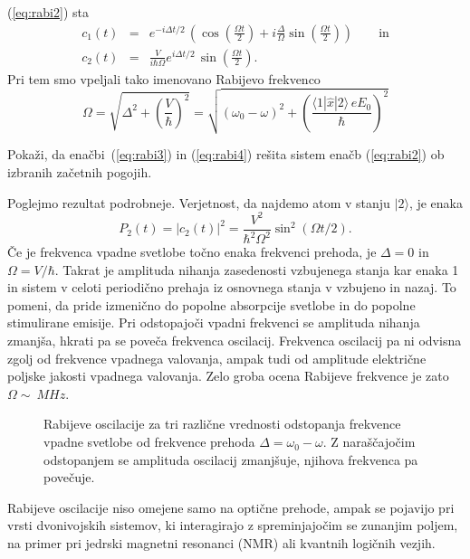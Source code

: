 (\ref{eq:rabi2}) sta 
\begin{eqnarray}
c_1(t)&=&e^{-i\Delta t/2}\, \left(\cos\left(\frac{\Omega t}{2}\right) + 
i \frac{\Delta}{\Omega} \sin\left(\frac{\Omega t}{2}\right) \right)\qquad \mathrm{in} 
\label{eq:rabi3} \\
c_2(t)&=&\frac{V}{i\hbar \Omega} e^{i\Delta t/2}\, \sin\left(\frac{\Omega t}{2}\right).
\label{eq:rabi4}
\end{eqnarray}
Pri tem smo vpeljali tako imenovano Rabijevo frekvenco
\begin{equation}
\Omega = \sqrt{\Delta^2 + \left(\frac{V}{\hbar}\right)^2} = \sqrt{(\omega_0-\omega)^2 
+ \left(\frac{\langle1|\hat{x}|2\rangle\, eE_0}{\hbar}\right)^2}
\end{equation}
\begin{definition}
Pokaži, da enačbi~(\ref{eq:rabi3}) in (\ref{eq:rabi4}) rešita
sistem enačb (\ref{eq:rabi2}) ob izbranih začetnih pogojih.
\end{definition}
Poglejmo rezultat podrobneje. Verjetnost, da najdemo atom v stanju $|2\rangle$, je enaka
\begin{equation}
P_2(t) = |c_2(t)|^2 = \frac{V^2}{\hbar^2 \Omega^2}\sin^2(\Omega t/2).
\end{equation}
Če je frekvenca vpadne svetlobe točno enaka frekvenci prehoda, je $\Delta = 0$ in 
$\Omega = V/\hbar$. Takrat je amplituda nihanja zasedenosti vzbujenega stanja kar enaka 1
in sistem v celoti periodično prehaja iz osnovnega stanja v vzbujeno in nazaj. To pomeni,
da pride izmenično do popolne absorpcije svetlobe in do popolne stimulirane emisije.
Pri odstopajoči vpadni frekvenci se amplituda nihanja zmanjša, hkrati pa se poveča
frekvenca oscilacij. Frekvenca oscilacij pa ni odvisna zgolj od frekvence vpadnega valovanja, 
ampak tudi od amplitude električne poljske jakosti vpadnega valovanja. Zelo groba ocena
Rabijeve frekvence je zato $\Omega \sim~\si{MHz}$.
\begin{figure}[h]
\centering
\def\svgwidth{100truemm} 

\caption{Rabijeve oscilacije za tri različne vrednosti odstopanja frekvence vpadne
svetlobe od frekvence prehoda $\Delta=\omega_0-\omega$. 
Z naraščajočim odstopanjem se amplituda oscilacij
zmanjšuje, njihova frekvenca pa povečuje.}
\label{fig:Rabi}
\end{figure}
\begin{remark}
Rabijeve oscilacije niso omejene samo na optične prehode, ampak se pojavijo pri 
vrsti dvonivojskih sistemov, ki interagirajo z spreminjajočim se zunanjim poljem, na primer
pri jedrski magnetni resonanci (NMR) ali kvantnih logičnih vezjih.
\end{remark}
